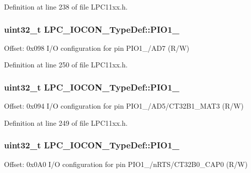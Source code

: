 Definition at line 238 of file L\+P\+C11xx.\+h.

\subsubsection[{\texorpdfstring{P\+I\+O1\+\_\+11}{PIO1_11}}]{ uint32\+\_\+t L\+P\+C\+\_\+\+I\+O\+C\+O\+N\+\_\+\+Type\+Def\+::\+P\+I\+O1\+\_}\hypertarget{group___l_p_c11xx___definitions_ga4f916a71decccb5aac0af7249b098ac5}{}\label{group___l_p_c11xx___definitions_ga4f916a71decccb5aac0af7249b098ac5}
Offset\+: 0x098 I/O configuration for pin P\+I\+O1\+\_/\+A\+D7 (R/W) 

Definition at line 250 of file L\+P\+C11xx.\+h.

\subsubsection[{\texorpdfstring{P\+I\+O1\+\_\+4}{PIO1_4}}]{ uint32\+\_\+t L\+P\+C\+\_\+\+I\+O\+C\+O\+N\+\_\+\+Type\+Def\+::\+P\+I\+O1\+\_}\hypertarget{group___l_p_c11xx___definitions_ga37567f664f663d9a9704e567629fa77b}{}\label{group___l_p_c11xx___definitions_ga37567f664f663d9a9704e567629fa77b}
Offset\+: 0x094 I/O configuration for pin P\+I\+O1\+\_/\+A\+D5/\+C\+T32\+B1\+\_\+\+M\+A\+T3 (R/W) 

Definition at line 249 of file L\+P\+C11xx.\+h.

\subsubsection[{\texorpdfstring{P\+I\+O1\+\_\+5}{PIO1_5}}]{ uint32\+\_\+t L\+P\+C\+\_\+\+I\+O\+C\+O\+N\+\_\+\+Type\+Def\+::\+P\+I\+O1\+\_}\hypertarget{group___l_p_c11xx___definitions_ga755707b6d35e6497cd10aeb38bee443c}{}\label{group___l_p_c11xx___definitions_ga755707b6d35e6497cd10aeb38bee443c}
Offset\+: 0x0\+A0 I/O configuration for pin P\+I\+O1\+\_/n\+R\+T\+S/\+C\+T32\+B0\+\_\+\+C\+A\+P0 (R/W) 

